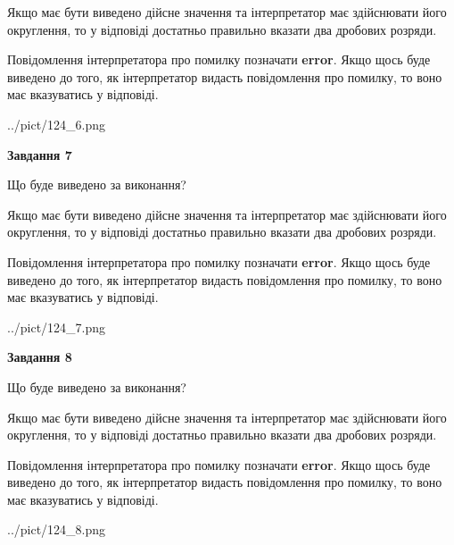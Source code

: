 \documentclass[12pt, ukrainian]{article}
\begin{document}
{\begin {Large}
Якщо має бути виведено дійсне значення та інтерпретатор має здійснювати його округлення, 
то у відповіді достатньо правильно вказати два дробових розряди.

Повідомлення інтерпретатора про помилку позначати \textbf{error}.
Якщо щось буде виведено до того, як інтерпретатор видасть повідомлення про помилку, 
то воно має вказуватись у відповіді. \par

\begin{center}
	{../pict/124_6.png}
\end{center}
\newpage

{\begin {center}\textbf{Завдання 7}\end {center}}\par
Що буде виведено за виконання? \par

Якщо має бути виведено дійсне значення та інтерпретатор має здійснювати його округлення, 
то у відповіді достатньо правильно вказати два дробових розряди.

Повідомлення інтерпретатора про помилку позначати \textbf{error}.
Якщо щось буде виведено до того, як інтерпретатор видасть повідомлення про помилку, 
то воно має вказуватись у відповіді. \par

\begin{center}
	{../pict/124_7.png}
\end{center}
\newpage

{\begin {center}\textbf{Завдання 8}\end {center}}\par
Що буде виведено за виконання? \par

Якщо має бути виведено дійсне значення та інтерпретатор має здійснювати його округлення, 
то у відповіді достатньо правильно вказати два дробових розряди.

Повідомлення інтерпретатора про помилку позначати \textbf{error}.
Якщо щось буде виведено до того, як інтерпретатор видасть повідомлення про помилку, 
то воно має вказуватись у відповіді. \par

\begin{center}
	{../pict/124_8.png}
\end{center}
\newpage


\end{Large}}
\end{document}
